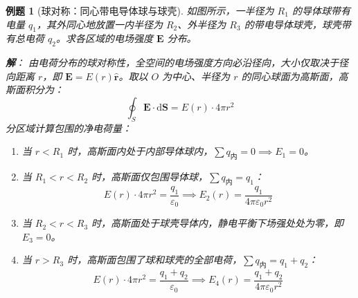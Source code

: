 \documentclass[11pt,a4paper,fontset=fandol]{ctexart}
\newtheorem{example}{例题}[section]
\theoremstyle{remark}
\begin{document}
\begin{example}[球对称：同心带电导体球与球壳]
如图所示，一半径为 $R_1$ 的导体球带有电量 $q_1$，其外同心地放置一内半径为 $R_2$、外半径为 $R_3$ 的带电导体球壳，球壳带有总电荷 $q_2$。求各区域的电场强度 $\bm{E}$ 分布。

\begin{center}
\end{center}

\textbf{解}：
由电荷分布的球对称性，全空间的电场强度方向必沿径向，大小仅取决于径向距离 $r$，即 $\bm{E} = E(r)\hat{\bm{r}}$。取以 $O$ 为中心、半径为 $r$ 的同心球面为高斯面，高斯面积分为：
\begin{equation*}
    \oint_S \bm{E} \cdot \mathrm{d}\bm{S} = E(r) \cdot 4\pi r^2
\end{equation*}
分区域计算包围的净电荷量：
\begin{enumerate}
    \item 当 $r < R_1$ 时，高斯面内处于内部导体球内，$\sum q_{\text{内}} = 0 \implies E_1 = 0$。
    \item 当 $R_1 < r < R_2$ 时，高斯面仅包围导体球，$\sum q_{\text{内}} = q_1$：
    \begin{equation*}
        E(r) \cdot 4\pi r^2 = \frac{q_1}{\varepsilon_0} \implies E_2(r) = \frac{q_1}{4\pi\varepsilon_0 r^2}
    \end{equation*}
    \item 当 $R_2 < r < R_3$ 时，高斯面处于球壳导体内，静电平衡下场强处处为零，即 $E_3 = 0$。
    \item 当 $r > R_3$ 时，高斯面包围了球和球壳的全部电荷，$\sum q_{\text{内}} = q_1 + q_2$：
    \begin{equation*}
        E(r) \cdot 4\pi r^2 = \frac{q_1 + q_2}{\varepsilon_0} \implies E_4(r) = \frac{q_1 + q_2}{4\pi\varepsilon_0 r^2}
    \end{equation*}
\end{enumerate}
\end{example}
\end{document}
